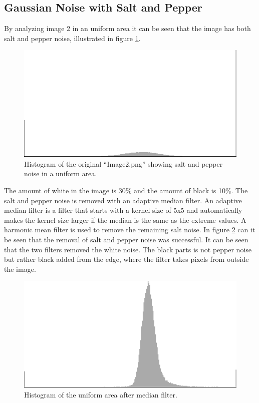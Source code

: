 \subsection{Gaussian Noise with Salt and Pepper}

By analyzing image 2 in an uniform area it can be seen that the image has both salt and pepper noise, illustrated in figure \ref{fig:hist2_uniform}.

\begin{figure}[H]
\centering
\includegraphics[width = \histogramWidth]{graphics/hist2_uniform.png}
\caption{Histogram of the original ``Image2.png'' showing salt and pepper noise in a uniform area.}
\label{fig:hist2_uniform}
\end{figure}

The amount of white in the image is 30\% and the amount of black is 10\%.
The salt and pepper noise is removed with an adaptive median filter.
An adaptive median filter is a filter that starts with a kernel size of 5x5 and automatically makes the kernel size larger if the median is the same as the extreme values.
A harmonic mean filter is used to remove the remaining salt noise.
In figure \ref{fig:hist2_median_harmonic} can it be seen that the removal of salt and pepper noise was successful.
It can be seen that the two filters removed the white noise.
The black parts is not pepper noise but rather black added from the edge, where the filter takes pixels from outside the image.

\begin{figure}[H]
\centering
\includegraphics[width = \histogramWidth]{graphics/hist2_after_median.png}
\caption{Histogram of the uniform area after median filter.}
\label{fig:hist2_median_harmonic}
\end{figure}

